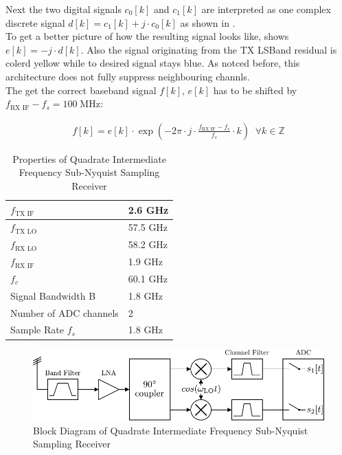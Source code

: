Next the two digital signals $c_0[k]$ and $c_1[k]$ are interpreted as one
complex discrete signal $d[k] = c_1[k] + j \cdot c_0[k]$ as shown in
. \\

To get a better picture of how the resulting signal looks like,
 shows $e[k] = -j \cdot d[k]$. Also the signal
originating from the \gls{TX} \gls{LSBand} residual is colerd yellow
while to desired signal stays blue.
As notced before, this architecture does not fully suppress neighbouring
channls. \\

The get the correct baseband signal $f[k]$, $e[k]$ has to be shifted by
$f_{\text{RX IF}} - f_s = 100 \; \text{MHz}$:

\begin{align}
  f[k] = e[k] \cdot \exp\left(-2\pi \cdot j \cdot
  \frac{f_{\text{RX IF}} - f_s}{f_s} \cdot k \right)
  \;\; \forall k \in \mathbb{Z}
\end{align}

\begin{table}[h]
  \centering
  \begin{tabular}{|l|l|}
    \hline
    $f_{\text{TX IF}}$ & 2.6 GHz \\ \hline
    $f_{\text{TX LO}}$ & 57.5 GHz \\ \hline
    $f_{\text{RX LO}}$ & 58.2 GHz \\ \hline
    $f_{\text{RX IF}}$ & 1.9 GHz \\ \hline
    $f_c$            & 60.1 GHz \\ \hline
    Signal Bandwidth B & 1.8 GHz \\ \hline
    Number of \gls{ADC} channels & 2 \\ \hline
    Sample Rate $f_s$ & 1.8 GHz \\ \hline
  \end{tabular}
  \caption{Properties of Quadrate Intermediate Frequency
    Sub-Nyquist Sampling Receiver}
  \label{tab:rx_2}
\end{table}

\begin{figure}[h!]
  \centering
  \includegraphics[width=\textwidth]{figures/quad_if_rx_block_diagram}
  \caption{Block Diagram of Quadrate Intermediate Frequency Sub-Nyquist Sampling Receiver}
  \label{fig:rx_2_bd}
\end{figure}

